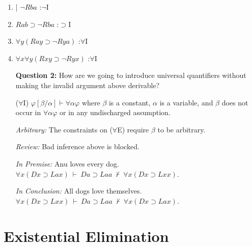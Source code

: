 \documentclass[a4paper, 11pt]{article} %
\newcommand{\unisub}[2]{[#1/#2]}
\begin{document}
\begin{enumerate}
    \item | $\neg Rba$ \hfill :$\neg$I \hspace{2.35in}\strut
    \item $Rab \supset \neg Rba$ \hfill :$\supset$I \hspace{2.35in}\strut
    \item $\forall y(Ray \supset \neg Rya)$ \hfill :$\forall$I \hspace{2.35in}\strut
    \item $\forall x\forall y(Rxy \supset \neg Ryx)$ \hfill :$\forall$I \hspace{2.35in}\strut
    \item[\bf Question 2:] How are we going to introduce universal quantifiers without making the invalid argument above derivable?
  \item[($\forall$I)] $\varphi\unisub{\beta}{\alpha} \vdash \forall\alpha\varphi$ where $\beta$ is a constant, $\alpha$ is a variable, and $\beta$ does not occur in $\forall\alpha\varphi$ or in any undischarged assumption. 
  \item[\it Arbitrary:] The constraints on ($\forall$E) require $\beta$ to be arbitrary. 
  \item[\it Review:] Bad inference above is blocked.
  \item[\it In Premise:] Anu loves every dog.\\
    $\forall x(Dx \supset Lax)\ \vdash\ Da \supset Laa\ \nvdash\ \forall x(Dx \supset Lxx)$.
  \item[\it In Conclusion:] All dogs love themselves.\\
    $\forall x(Dx \supset Lxx)\ \vdash\ Da \supset Laa\ \nvdash\ \forall x(Dx \supset Lax)$.
\end{enumerate}






\section*{Existential Elimination}
\end{document}
